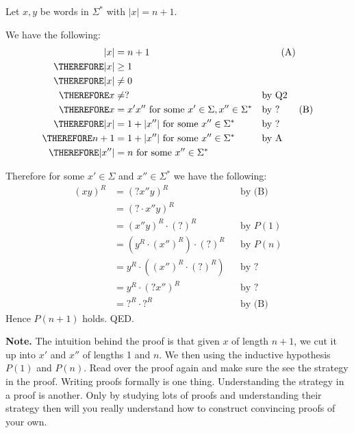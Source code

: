 Let $x,y$ be words in $\Sigma^*$ with $|x| = n + 1$.

We have the following:
\begin{align*}
           |x| &= n + 1  & & \tag{A} \\ 
\THEREFORE |x| &\geq 1 \\
\THEREFORE |x| &\neq 0 \\
\THEREFORE x &\neq ? & & \text{by Q2} \\
\THEREFORE x &= x'x'' \text{ for some } x' \in \Sigma, x'' \in \Sigma^* 
           & & \text{by ?} 
           \tag{B} \\
\THEREFORE |x| &= 1 + |x''| \text{ for some } x'' \in \Sigma^*
           & & \text{by ?} \\
\THEREFORE n + 1 &= 1 + |x''| \text{ for some } x'' \in \Sigma^*
           & & \text{by A} \\
\THEREFORE |x''| &= n \text{ for some } x'' \in \Sigma^*
\end{align*}

Therefore for some $x' \in \Sigma$ and $x'' \in \Sigma^*$
we have the following:
\begin{align*}
(xy)^R
&= (?x'' y)^R                                   & & \text{by (B)} \\
&= (? \cdot x''y)^R                                               \\
&= (x''y)^R \cdot (?)^R                         & & \text{by $P(1)$}\\
&= \left( y^R \cdot (x'')^R \right) \cdot (?)^R & & \text{by $P(n)$} \\
&= y^R \cdot \left( (x'')^R \cdot (?)^R \right) & & \text{by ?}\\
&= y^R \cdot \left( ?x'' \right)^R              & & \text{by ?}\\
&= ?^R \cdot ?^R                                & & \text{by (B)} 
\end{align*}
Hence $P(n+1)$ holds.
QED.


{\bf Note.}
The intuition behind the proof is that 
given $x$ of length $n + 1$,
we cut it up into $x'$ and $x''$ of lengths 1 and $n$.
We then using the inductive hypothesis $P(1)$ and $P(n)$.
Read over the proof again and make sure the see the strategy
in the proof.
Writing proofs formally is one thing.
Understanding the strategy in a proof is another.
Only by studying lots of proofs and understanding their strategy
then will you really understand how to construct convincing proofs
of your own.
